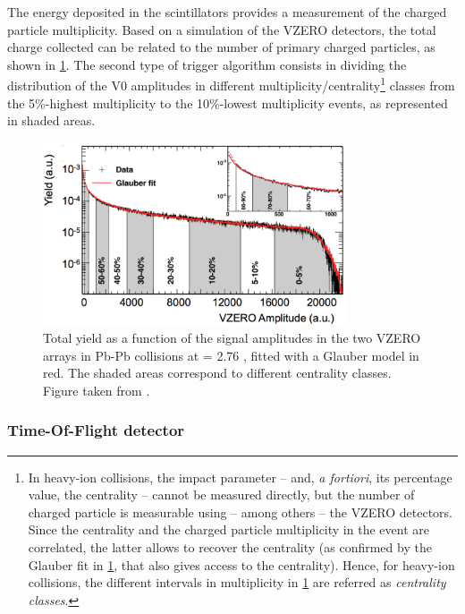 The energy deposited in the scintillators provides a measurement of the charged particle multiplicity. Based on a simulation of the VZERO detectors, the total charge collected can be related to the number of primary charged particles, as shown in \fig\ref{fig:VZEROcentrality}. The second type of trigger algorithm consists in dividing the distribution of the V0 amplitudes in different multiplicity/centrality\footnote{In heavy-ion collisions, the impact parameter -- and, \textit{a fortiori}, its percentage value, the centrality -- cannot be measured directly, but the number of charged particle is measurable using -- among others -- the VZERO detectors. Since the centrality and the charged particle multiplicity in the event are correlated, the latter allows to recover the centrality (as confirmed by the Glauber fit in \fig\ref{fig:VZEROcentrality}, that also gives access to the centrality). Hence, for heavy-ion collisions, the different intervals in multiplicity in \fig\ref{fig:VZEROcentrality} are referred as \textit{centrality classes}.} classes from the 5\%-highest multiplicity to the 10\%-lowest multiplicity events, as represented in shaded areas. 

\begin{figure}[h]
	\centering
	\includegraphics[width=0.8\textwidth]{Figs/Chapter3/Fig8-4236.png}
	\caption{Total yield as a function of the signal amplitudes in the two VZERO arrays in Pb-Pb collisions at \sqrtSnn = 2.76 \tev, fitted with a Glauber model in red. The shaded areas correspond to different centrality classes. Figure taken from \cite{alicecollaborationPerformanceALICEVZERO2013}.}
	\label{fig:VZEROcentrality}
\end{figure}

\subsubsection{Time-Of-Flight detector}
\label{subsubsec:TOF}

